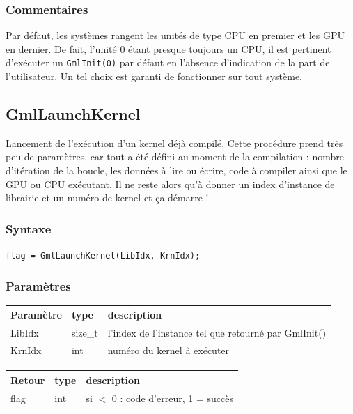 \documentclass[a4paper,12pt]{article}
\begin{document}
\subsubsection*{Commentaires}
Par défaut, les systèmes rangent les unités de type CPU en premier et les GPU en dernier.
De fait, l'unité 0 étant presque toujours un CPU, il est pertinent d'exécuter un {\tt GmlInit(0)} par défaut en l'absence d'indication de la part de l'utilisateur. Un tel choix est garanti de fonctionner sur tout système.


\subsection{GmlLaunchKernel}

Lancement de l'exécution d'un kernel déjà compilé.
Cette procédure prend très peu de paramètres, car tout a été défini au moment de la compilation : nombre d'itération de la boucle, les données à lire ou écrire, code à compiler ainsi que le GPU ou CPU exécutant.
Il ne reste alors qu'à donner un index d'instance de librairie et un numéro de kernel et ça démarre !

\subsubsection*{Syntaxe}

{\tt flag = GmlLaunchKernel(LibIdx, KrnIdx);}

\subsubsection*{Paramètres}

\begin{tabular}{|m{2cm}|m{1.5cm}|m{10.5cm}|}
\hline
Paramètre  & type    & description \\
\hline
LibIdx     & size\_t & l'index de l'instance tel que retourné par GmlInit() \\
\hline
KrnIdx     & int     & numéro du kernel à exécuter \\
\hline
\end{tabular}

\medskip

\begin{tabular}{|m{2cm}|m{1.5cm}|m{10.5cm}|}
\hline
Retour     & type    & description \\
\hline
flag       & int     & si $<$ 0 : code d'erreur, 1 = succès \\
\hline
\end{tabular}
\end{document}
